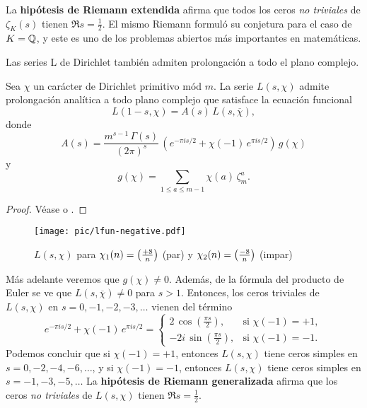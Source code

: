 La \textbf{hipótesis de Riemann extendida} afirma que todos los ceros
\emph{no triviales} de $\zeta_K (s)$ tienen $\Re s = \frac{1}{2}$. El mismo
Riemann formuló su conjetura para el caso de $K = \mathbb{Q}$, y este es uno de los
problemas abiertos más importantes en matemáticas.

\vspace{1em}

Las series L de Dirichlet también admiten prolongación a todo el plano complejo.

\begin{teorema}
  Sea $\chi$ un carácter de Dirichlet primitivo mód $m$. La serie $L (s,\chi)$
  admite prolongación analítica a todo plano complejo que satisface la ecuación
  funcional
  $$L (1-s,\chi) = A(s) \, L (s,\overline{\chi}),$$
  donde
  $$A (s) = \frac{m^{s-1}\,\Gamma (s)}{(2\pi)^s} \, \left(e^{-\pi i s/2} + \chi (-1)\,e^{\pi i s/2}\right)\,g (\chi)$$
  y
  $$g (\chi) = \sum_{1 \le a \le m-1} \chi (a) \, \zeta_m^a.$$

  \begin{proof}
    Véase \cite[\S VII.2]{Neukirch-ANT} o \cite[Chapter~12]{Apostol-analytic}.
  \end{proof}
\end{teorema}

\begin{figure}
  \begin{center}
    \texttt{[image: pic/lfun-negative.pdf]}
  \end{center}

  \caption{$L (s,\chi)$ para $\chi_1 (n) = \left(\frac{+8}{n}\right)$ (par) y $\chi_2 (n) = \left(\frac{-8}{n}\right)$ (impar)}
\end{figure}

Más adelante veremos que $g (\chi) \ne 0$. Además, de la fórmula del producto de
Euler se ve que $L (s,\overline{\chi}) \ne 0$ para $s > 1$. Entonces, los ceros
triviales de $L (s,\chi)$ en $s = 0,-1,-2,-3,\ldots$ vienen del término
\[ e^{-\pi i s/2} + \chi (-1)\,e^{\pi i s/2} = \begin{cases}
  2 \, \cos \left(\frac{\pi s}{2}\right), & \text{si }\chi (-1) = +1,\\
  -2i \, \sin \left(\frac{\pi s}{2}\right), & \text{si }\chi (-1) = -1.
\end{cases} \]
Podemos concluir que si $\chi (-1) = +1$, entonces $L (s,\chi)$ tiene ceros
simples en $s = 0, -2, -4, -6, \ldots$, y si $\chi (-1) = -1$, entonces
$L (s,\chi)$ tiene ceros simples en $s = -1, -3, -5, \ldots$
La \textbf{hipótesis de Riemann generalizada} afirma que los ceros
\emph{no triviales} de $L (s,\chi)$ tienen $\Re s = \frac{1}{2}$.

